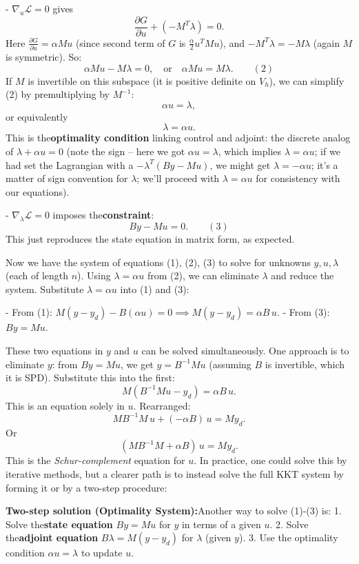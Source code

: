 \documentclass[a4paper,10pt]{report}
\begin{document}
- \(\nabla_u \mathcal{L} = 0\) gives
\[\frac{\partial G}{\partial u} + (-M^T \lambda) = 0.\]
Here \(\frac{\partial G}{\partial u} = \alpha M u\) (since second term of \(G\) is \(\frac{\alpha}{2} u^T M u\)), and \(-M^T \lambda = -M \lambda\) (again \(M\) is symmetric). So:
\[\alpha M u - M \lambda = 0, \quad \text{or} \quad \alpha M u = M \lambda. \qquad (2)\]
If \(M\) is invertible on this subspace (it is positive definite on \(V_h\)), we can simplify (2) by premultiplying by \(M^{-1}\):
\[\alpha u = \lambda,\]
or equivalently \[\lambda = \alpha u.\]
This is the\textbf{optimality condition} linking control and adjoint: the discrete analog of \(\lambda + \alpha u = 0\) (note the sign – here we got \(\alpha u = \lambda\), which implies \(\lambda = \alpha u\); if we had set the Lagrangian with a \(-\lambda^T(By - Mu)\), we might get \(\lambda = -\alpha u\); it's a matter of sign convention for \(\lambda\); we'll proceed with \(\lambda = \alpha u\) for consistency with our equations).

- \(\nabla_{\lambda} \mathcal{L} = 0\) imposes the\textbf{constraint}:
\[B y - M u = 0. \qquad (3)\]
This just reproduces the state equation in matrix form, as expected.

Now we have the system of equations (1), (2), (3) to solve for unknowns \(y, u, \lambda\) (each of length \(n\)). Using \(\lambda = \alpha u\) from (2), we can eliminate \(\lambda\) and reduce the system. Substitute \(\lambda = \alpha u\) into (1) and (3):

- From (1): \(M(y - y_d) - B(\alpha u) = 0 \implies M(y - y_d) = \alpha B\,u\).
- From (3): \(B y = M u\).

These two equations in \(y\) and \(u\) can be solved simultaneously. One approach is to eliminate \(y\): from \(B y = M u\), we get \(y = B^{-1} M u\) (assuming \(B\) is invertible, which it is SPD). Substitute this into the first:
\[M(B^{-1} M u - y_d) = \alpha B\, u.\]
This is an equation solely in \(u\). Rearranged:
\[M B^{-1} M\, u + (-\alpha B)\, u = M y_d.\]
Or
\[(M B^{-1} M + \alpha B)\, u = M y_d.\]
This is the \emph{Schur-complement} equation for \(u\). In practice, one could solve this by iterative methods, but a clearer path is to instead solve the full KKT system by forming it or by a two-step procedure:

\textbf{Two-step solution (Optimality System):}Another way to solve (1)-(3) is:
1. Solve the\textbf{state equation} \(B y = M u\) for \(y\) in terms of a given \(u\).
2. Solve the\textbf{adjoint equation} \(B \lambda = M(y - y_d)\) for \(\lambda\) (given \(y\)).
3. Use the optimality condition \(\alpha u = \lambda\) to update \(u\).
\end{document}
